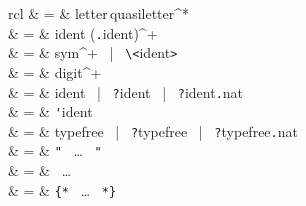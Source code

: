 \begin{isabellebody}
\begin{isamarkuptext}
  \begin{matharray}{rcl}
    \hypertarget{syntax.ident}{\hyperlink{syntax.ident}{\mbox{}}} & = & letter\,quasiletter^* \\
    \hypertarget{syntax.longident}{\hyperlink{syntax.longident}{\mbox{}}} & = & ident (\verb,.,ident)^+ \\
    \hypertarget{syntax.symident}{\hyperlink{syntax.symident}{\mbox{}}} & = & sym^+ ~|~ \verb,\,\verb,<,ident\verb,>, \\
    \hypertarget{syntax.nat}{\hyperlink{syntax.nat}{\mbox{}}} & = & digit^+ \\
    \hypertarget{syntax.var}{\hyperlink{syntax.var}{\mbox{}}} & = & ident ~|~ \verb,?,ident ~|~ \verb,?,ident\verb,.,nat \\
    \hypertarget{syntax.typefree}{\hyperlink{syntax.typefree}{\mbox{}}} & = & \verb,',ident \\
    \hypertarget{syntax.typevar}{\hyperlink{syntax.typevar}{\mbox{}}} & = & typefree ~|~ \verb,?,typefree ~|~ \verb,?,typefree\verb,.,nat \\
    \hypertarget{syntax.string}{\hyperlink{syntax.string}{\mbox{}}} & = & \verb,", ~\dots~ \verb,", \\
    \hypertarget{syntax.altstring}{\hyperlink{syntax.altstring}{\mbox{}}} & = & \backquote ~\dots~ \backquote \\
    \hypertarget{syntax.verbatim}{\hyperlink{syntax.verbatim}{\mbox{}}} & = & \verb,{*, ~\dots~ \verb,*,\verb,}, \\[1ex]


\end{matharray}
\end{isamarkuptext}
\end{isabellebody}
